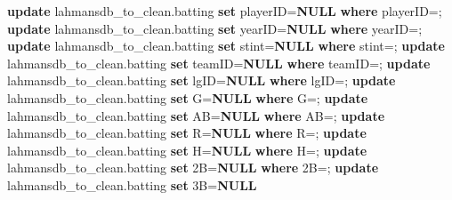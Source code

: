 \documentclass[11pt]{article}
\newenvironment{Shaded}{}{}
\newcommand{\KeywordTok}[1]{\textcolor[rgb]{0.00,0.44,0.13}{\textbf{{#1}}}}
\newcommand{\StringTok}[1]{\textcolor[rgb]{0.25,0.44,0.63}{{#1}}}
\newcommand{\NormalTok}[1]{{#1}}
\newcommand{\OperatorTok}[1]{\textcolor[rgb]{0.40,0.40,0.40}{{#1}}}
\begin{document}
\begin{Shaded}
\begin{Highlighting}[]
\KeywordTok{update}\NormalTok{ lahmansdb\_to\_clean.batting}
\KeywordTok{set}\NormalTok{ playerID}\OperatorTok{=}\KeywordTok{NULL}
\KeywordTok{where}\NormalTok{ playerID}\OperatorTok{=}\StringTok{\textquotesingle{}\textquotesingle{}}\NormalTok{;}
\KeywordTok{update}\NormalTok{ lahmansdb\_to\_clean.batting}
\KeywordTok{set}\NormalTok{ yearID}\OperatorTok{=}\KeywordTok{NULL}
\KeywordTok{where}\NormalTok{ yearID}\OperatorTok{=}\StringTok{\textquotesingle{}\textquotesingle{}}\NormalTok{;}
\KeywordTok{update}\NormalTok{ lahmansdb\_to\_clean.batting}
\KeywordTok{set}\NormalTok{ stint}\OperatorTok{=}\KeywordTok{NULL}
\KeywordTok{where}\NormalTok{ stint}\OperatorTok{=}\StringTok{\textquotesingle{}\textquotesingle{}}\NormalTok{;}
\KeywordTok{update}\NormalTok{ lahmansdb\_to\_clean.batting}
\KeywordTok{set}\NormalTok{ teamID}\OperatorTok{=}\KeywordTok{NULL}
\KeywordTok{where}\NormalTok{ teamID}\OperatorTok{=}\StringTok{\textquotesingle{}\textquotesingle{}}\NormalTok{;}
\KeywordTok{update}\NormalTok{ lahmansdb\_to\_clean.batting}
\KeywordTok{set}\NormalTok{ lgID}\OperatorTok{=}\KeywordTok{NULL}
\KeywordTok{where}\NormalTok{ lgID}\OperatorTok{=}\StringTok{\textquotesingle{}\textquotesingle{}}\NormalTok{;}
\KeywordTok{update}\NormalTok{ lahmansdb\_to\_clean.batting}
\KeywordTok{set}\NormalTok{ G}\OperatorTok{=}\KeywordTok{NULL}
\KeywordTok{where}\NormalTok{ G}\OperatorTok{=}\StringTok{\textquotesingle{}\textquotesingle{}}\NormalTok{;}
\KeywordTok{update}\NormalTok{ lahmansdb\_to\_clean.batting}
\KeywordTok{set}\NormalTok{ AB}\OperatorTok{=}\KeywordTok{NULL}
\KeywordTok{where}\NormalTok{ AB}\OperatorTok{=}\StringTok{\textquotesingle{}\textquotesingle{}}\NormalTok{;}
\KeywordTok{update}\NormalTok{ lahmansdb\_to\_clean.batting}
\KeywordTok{set}\NormalTok{ R}\OperatorTok{=}\KeywordTok{NULL}
\KeywordTok{where}\NormalTok{ R}\OperatorTok{=}\StringTok{\textquotesingle{}\textquotesingle{}}\NormalTok{;}
\KeywordTok{update}\NormalTok{ lahmansdb\_to\_clean.batting}
\KeywordTok{set}\NormalTok{ H}\OperatorTok{=}\KeywordTok{NULL}
\KeywordTok{where}\NormalTok{ H}\OperatorTok{=}\StringTok{\textquotesingle{}\textquotesingle{}}\NormalTok{;}
\KeywordTok{update}\NormalTok{ lahmansdb\_to\_clean.batting}
\KeywordTok{set}\NormalTok{ 2B}\OperatorTok{=}\KeywordTok{NULL}
\KeywordTok{where}\NormalTok{ 2B}\OperatorTok{=}\StringTok{\textquotesingle{}\textquotesingle{}}\NormalTok{;}
\KeywordTok{update}\NormalTok{ lahmansdb\_to\_clean.batting}
\KeywordTok{set}\NormalTok{ 3B}\OperatorTok{=}\KeywordTok{NULL}

\end{Highlighting}
\end{Shaded}
\end{document}
